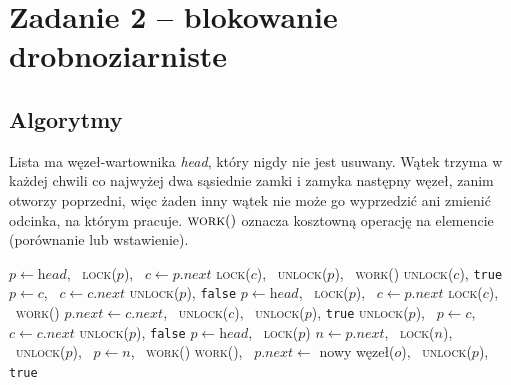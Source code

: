 \documentclass[11pt,a4paper]{article}
\newenvironment{algorytm}[1][htb]
  {\par\bigskip\floatname{algorithm}{}\renewcommand{\thealgorithm}{}
   \begin{algorithm}[#1]%
  }{\end{algorithm}\par\bigskip}
\begin{document}
\section{Zadanie 2 -- blokowanie drobnoziarniste}
\subsection{Algorytmy}
Lista ma węzeł-wartownika \textit{head}, który nigdy nie jest usuwany. Wątek trzyma w każdej chwili
co najwyżej dwa sąsiednie zamki i zamyka następny węzeł, zanim otworzy poprzedni, więc żaden
inny wątek nie może go wyprzedzić ani zmienić odcinka, na którym pracuje. $\textsc{work}()$ oznacza
kosztowną operację na elemencie (porównanie lub wstawienie).

\begin{algorytm}[H]
\begin{algorithmic}[1]
        \State $p \gets \textit{head}$, \ \textsc{lock}($p$), \ $c \gets p.\textit{next}$
            \State \textsc{lock}($c$), \ \textsc{unlock}($p$), \ \textsc{work}()
             \textsc{unlock}($c$), \Return \texttt{true}
            \EndIf
            \State $p \gets c$, \ $c \gets c.\textit{next}$
        \EndWhile
        \State \textsc{unlock}($p$), \Return \texttt{false}
    \EndProcedure
        \State $p \gets \textit{head}$, \ \textsc{lock}($p$), \ $c \gets p.\textit{next}$
            \State \textsc{lock}($c$), \ \textsc{work}() 
                \State $p.\textit{next} \gets c.\textit{next}$, \ \textsc{unlock}($c$), \ \textsc{unlock}($p$), \Return \texttt{true}
            \EndIf
            \State \textsc{unlock}($p$), \ $p \gets c$, \ $c \gets c.\textit{next}$
        \EndWhile
        \State \textsc{unlock}($p$), \Return \texttt{false}
    \EndProcedure
        \State $p \gets \textit{head}$, \ \textsc{lock}($p$)
            \State $n \gets p.\textit{next}$, \ \textsc{lock}($n$), \ \textsc{unlock}($p$), \ $p \gets n$, \ \textsc{work}()
        \EndWhile
        \State \textsc{work}(), \ $p.\textit{next} \gets$ nowy węzeł($o$), \ \textsc{unlock}($p$), \Return \texttt{true}
    \EndProcedure
\end{algorithmic}
\caption{Lista z blokowaniem drobnoziarnistym}
\end{algorytm}
\end{document}
